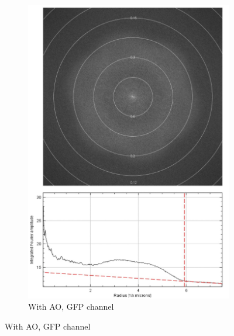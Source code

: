 \begin{figure}
\begin{subfigure}[t]{0.45\textwidth}
		\includegraphics[width=\linewidth]{images/DeepSIM_NMJ_AO_GFP_ft_and_plot.jpg}
		\caption{With AO, GFP channel}
		\label{fig:DeepSIM_NMJ_AO_GFP_ft_and_plot}
	\end{subfigure}



\end{figure}
